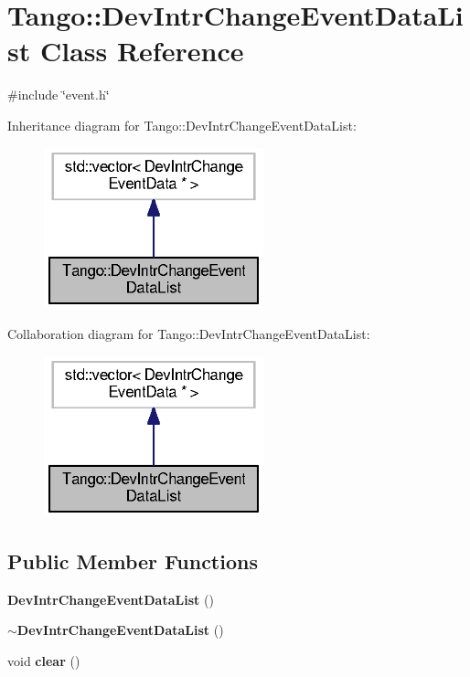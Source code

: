 \section{Tango\-:\-:Dev\-Intr\-Change\-Event\-Data\-List Class Reference}
\label{classTango_1_1DevIntrChangeEventDataList}


{\ttfamily \#include \char`\"{}event.\-h\char`\"{}}



Inheritance diagram for Tango\-:\-:Dev\-Intr\-Change\-Event\-Data\-List\-:
\nopagebreak
\begin{figure}[H]
\begin{center}
\leavevmode
\includegraphics[width=180pt]{dc/d4c/classTango_1_1DevIntrChangeEventDataList__inherit__graph}
\end{center}
\end{figure}


Collaboration diagram for Tango\-:\-:Dev\-Intr\-Change\-Event\-Data\-List\-:
\nopagebreak
\begin{figure}[H]
\begin{center}
\leavevmode
\includegraphics[width=180pt]{de/d23/classTango_1_1DevIntrChangeEventDataList__coll__graph}
\end{center}
\end{figure}
\subsection*{Public Member Functions}
\begin{DoxyCompactItemize}
\item 
{\bf Dev\-Intr\-Change\-Event\-Data\-List} ()
\item 
{\bf $\sim$\-Dev\-Intr\-Change\-Event\-Data\-List} ()
\item 
void {\bf clear} ()
\end{DoxyCompactItemize}


